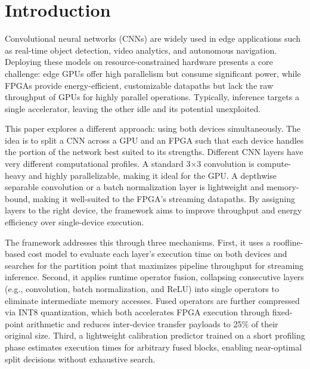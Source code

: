 \documentclass[runningheads]{llncs}
\begin{document}
\begin{abstract}
constants keeps the unit-space gains' sign stable ($P(\text{gain}>0)=100\%$). Finally, we correct an over-optimistic in-model predictor result: under leave-one-architecture-out evaluation on synthesized targets, scheduling regret is 12.34--36.99\%, versus the 0.20\% obtained when training and testing on the analytical formula itself.

\end{abstract}

\section{Introduction}\label{sec:introduction}

Convolutional neural networks (CNNs) are widely used in edge applications such as real-time object detection, video analytics, and autonomous navigation. Deploying these models on resource-constrained hardware presents a core challenge: edge GPUs offer high parallelism but consume significant power, while FPGAs provide energy-efficient, customizable datapaths but lack the raw throughput of GPUs for highly parallel operations. Typically, inference targets a single accelerator, leaving the other idle and its potential unexploited.

This paper explores a different approach: using both devices simultaneously. The idea is to split a CNN across a GPU and an FPGA such that each device handles the portion of the network best suited to its strengths. Different CNN layers have very different computational profiles. A standard 3$\times$3 convolution is compute-heavy and highly parallelizable, making it ideal for the GPU. A depthwise separable convolution or a batch normalization layer is lightweight and memory-bound, making it well-suited to the FPGA's streaming datapaths. By assigning layers to the right device, the framework aims to improve throughput and energy efficiency over single-device execution.

The framework addresses this through three mechanisms. First, it uses a roofline-based cost model to evaluate each layer's execution time on both devices and searches for the partition point that maximizes pipeline throughput for streaming inference. Second, it applies runtime operator fusion, collapsing consecutive layers (e.g., convolution, batch normalization, and ReLU) into single operators to eliminate intermediate memory accesses. Fused operators are further compressed via INT8 quantization, which both accelerates FPGA execution through fixed-point arithmetic and reduces inter-device transfer payloads to 25\% of their original size. Third, a lightweight calibration predictor trained on a short profiling phase estimates execution times for arbitrary fused blocks, enabling near-optimal split decisions without exhaustive search.
\end{document}
